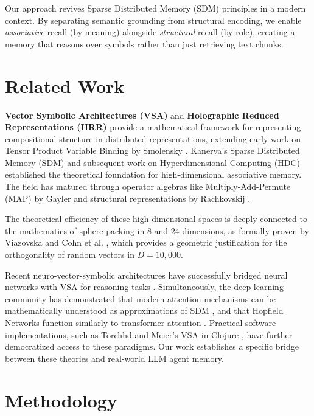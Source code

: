 \documentclass[11pt,letterpaper]{article}
\begin{document}
Our approach revives Sparse Distributed Memory (SDM) principles \cite{kanerva1988sdm} in a modern context. By separating semantic grounding from structural encoding, we enable \textit{associative} recall (by meaning) alongside \textit{structural} recall (by role), creating a memory that reasons over symbols rather than just retrieving text chunks.

\section{Related Work}
\label{sec:related}

\textbf{Vector Symbolic Architectures (VSA)} and \textbf{Holographic Reduced Representations (HRR)} \cite{plate1995holographic} provide a mathematical framework for representing compositional structure in distributed representations, extending early work on Tensor Product Variable Binding by Smolensky \cite{smolensky1990tensor}. Kanerva's Sparse Distributed Memory (SDM) \cite{kanerva1988sdm} and subsequent work on Hyperdimensional Computing (HDC) \cite{kanerva2009hyperdimensional} established the theoretical foundation for high-dimensional associative memory. The field has matured through operator algebras like Multiply-Add-Permute (MAP) by Gayler \cite{gayler2004vsa} and structural representations by Rachkovskij \cite{rachkovskij2001representation}.

The theoretical efficiency of these high-dimensional spaces is deeply connected to the mathematics of sphere packing in 8 and 24 dimensions, as formally proven by Viazovska \cite{viazovska2017sphere} and Cohn et al. \cite{cohn2017sphere}, which provides a geometric justification for the orthogonality of random vectors in $D=10,000$.

Recent neuro-vector-symbolic architectures have successfully bridged neural networks with VSA for reasoning tasks \cite{hersche2023neuro, kleyko2022vector}. Simultaneously, the deep learning community has demonstrated that modern attention mechanisms \cite{vaswani2017attention} can be mathematically understood as approximations of SDM \cite{bricken2021attention}, and that Hopfield Networks function similarly to transformer attention \cite{ramsauer2020hopfield}. Practical software implementations, such as Torchhd \cite{heddes2022torchhd} and Meier's VSA in Clojure \cite{meier2022vsa}, have further democratized access to these paradigms. Our work establishes a specific bridge between these theories and real-world LLM agent memory.

\section{Methodology}
\label{sec:methodology}
\end{document}
